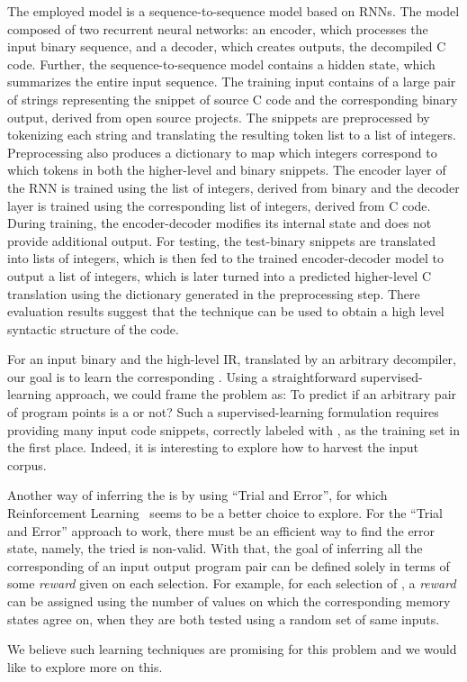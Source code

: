 The employed model is  a sequence-to-sequence model based on RNNs. The model
composed of two recurrent neural networks: an encoder, which processes the
input binary sequence, and a decoder, which creates outputs, the decompiled C
code. Further, the sequence-to-sequence model contains a hidden state, which
summarizes the entire input sequence. 
%
The training input contains of a large pair of strings representing the snippet
of source C code and the corresponding binary output, derived from open source
projects.  The snippets are preprocessed  by tokenizing each string  and
translating the resulting token list to a list of integers. Preprocessing also
produces a dictionary to map which integers correspond to which tokens in both
the higher-level and binary snippets.  The encoder layer of the RNN is trained
using the list of integers, derived from binary and the decoder layer is
trained using the corresponding list of integers, derived from C code.  During
training, the encoder-decoder modifies its internal state and does not provide
additional output. For testing, the test-binary snippets are translated into
lists of integers, which is then fed to the trained encoder-decoder model to
output a list of integers, which  is later turned into  a predicted higher-level C
translation using the dictionary  generated in the preprocessing step.
%
There evaluation results suggest that the technique  can be used to obtain a high level
syntactic structure of the code.
    
    
For an input binary and the high-level IR, translated by an arbitrary
decompiler, our goal is to learn the corresponding \syncp. Using a
straightforward  supervised-learning approach, we could frame the problem as:
To predict if an arbitrary pair of program points is a \syncp or not?
Such a supervised-learning formulation requires providing  many input code
snippets, correctly labeled with \syncps, as the training set in the first
place. Indeed, it is interesting to explore how to harvest the input corpus. 
 

Another way of inferring the \syncps is by using ``Trial and Error'', for which
Reinforcement Learning~\cite{Sutton:1998} seems to be a better choice to
explore. For the ``Trial and Error'' approach to work, there must be an
efficient way to find the error state, namely, the tried \syncp is non-valid.
With that, the goal of inferring all the corresponding \syncps of an input
output program pair can be defined solely in terms of some \emph{reward} given
on each selection. For example, for each selection of \syncp, a \emph{reward}
can be assigned using the number of values on which the corresponding memory
states agree on, when they are both tested using a random set of same  inputs.

We believe such learning techniques are promising for this problem and we would like to explore more on this.
